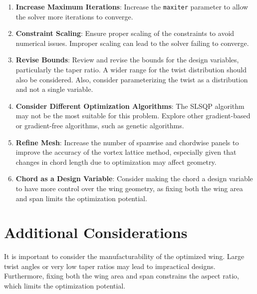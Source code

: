 \documentclass{article}
\begin{document}
\begin{enumerate}
    \item \textbf{Increase Maximum Iterations}: Increase the \texttt{maxiter} parameter to allow the solver more iterations to converge.
    \item \textbf{Constraint Scaling}: Ensure proper scaling of the constraints to avoid numerical issues. Improper scaling can lead to the solver failing to converge.
    \item \textbf{Revise Bounds}: Review and revise the bounds for the design variables, particularly the taper ratio. A wider range for the twist distribution should also be considered. Also, consider parameterizing the twist as a distribution and not a single variable.
    \item \textbf{Consider Different Optimization Algorithms}: The SLSQP algorithm may not be the most suitable for this problem. Explore other gradient-based or gradient-free algorithms, such as genetic algorithms.
    \item \textbf{Refine Mesh}: Increase the number of spanwise and chordwise panels to improve the accuracy of the vortex lattice method, especially given that changes in chord length due to optimization may affect geometry.
    \item \textbf{Chord as a Design Variable}: Consider making the chord a design variable to have more control over the wing geometry, as fixing both the wing area and span limits the optimization potential.
\end{enumerate}

\section{Additional Considerations}

It is important to consider the manufacturability of the optimized wing. Large twist angles or very low taper ratios may lead to impractical designs. Furthermore, fixing both the wing area and span constrains the aspect ratio, which limits the optimization potential.
\end{document}
